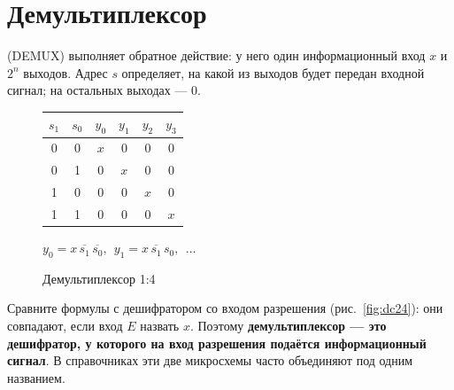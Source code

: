 \section{Демультиплексор}

 (DEMUX) выполняет обратное действие: у него один
информационный вход $x$ и $2^n$ выходов. Адрес $s$ определяет, на какой из
выходов будет передан входной сигнал; на остальных выходах --- 0.

\begin{figure}[H]
\centering
\begin{minipage}{0.35\textwidth}
\centering
{}
\end{minipage}\hfill
\begin{minipage}{0.6\textwidth}
\centering
\begin{tabular}{cc|cccc}
\toprule
$s_1$ & $s_0$ & $y_0$ & $y_1$ & $y_2$ & $y_3$ \\
\midrule
0 & 0 & $x$ & 0 & 0 & 0 \\
0 & 1 & 0 & $x$ & 0 & 0 \\
1 & 0 & 0 & 0 & $x$ & 0 \\
1 & 1 & 0 & 0 & 0 & $x$ \\
\bottomrule
\end{tabular}

\medskip
$y_0 = x\,\overline{s_1}\,\overline{s_0}, \ \ y_1 = x\,\overline{s_1}\,s_0, \ \ \ldots$
\end{minipage}
\caption{Демультиплексор 1:4}
\end{figure}

Сравните формулы с дешифратором со входом разрешения
(рис.~\ref{fig:dc24}): они совпадают, если вход $E$ назвать $x$. Поэтому
\textbf{демультиплексор --- это дешифратор, у которого на вход разрешения
подаётся информационный сигнал}. В справочниках эти две микросхемы часто
объединяют под одним названием.

